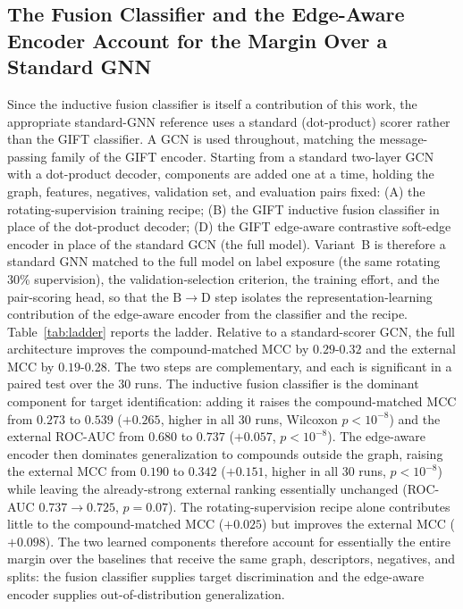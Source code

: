 \documentclass[11pt,letterpaper]{article}
\begin{document}
\subsection{The Fusion Classifier and the Edge-Aware Encoder Account for the Margin Over a Standard GNN}
\label{sec:ladder}
Since the inductive fusion classifier is itself a contribution of this work, the appropriate standard-GNN reference uses a standard (dot-product) scorer rather than the GIFT classifier. A GCN is used throughout, matching the message-passing family of the GIFT encoder. Starting from a standard two-layer GCN with a dot-product decoder, components are added one at a time, holding the graph, features, negatives, validation set, and evaluation pairs fixed: (A) the rotating-supervision training recipe; (B) the GIFT inductive fusion classifier in place of the dot-product decoder; (D) the GIFT edge-aware contrastive soft-edge encoder in place of the standard GCN (the full model). Variant~B is therefore a standard GNN matched to the full model on label exposure (the same rotating 30\% supervision), the validation-selection criterion, the training effort, and the pair-scoring head, so that the $\mathrm{B}\!\to\!\mathrm{D}$ step isolates the representation-learning contribution of the edge-aware encoder from the classifier and the recipe. Table~\ref{tab:ladder} reports the ladder. Relative to a standard-scorer GCN, the full architecture improves the compound-matched MCC by $0.29$-$0.32$ and the external MCC by $0.19$-$0.28$. The two steps are complementary, and each is significant in a paired test over the 30 runs. The inductive fusion classifier is the dominant component for target identification: adding it raises the compound-matched MCC from $0.273$ to $0.539$ ($+0.265$, higher in all 30 runs, Wilcoxon $p<10^{-8}$) and the external ROC-AUC from $0.680$ to $0.737$ ($+0.057$, $p<10^{-8}$). The edge-aware encoder then dominates generalization to compounds outside the graph, raising the external MCC from $0.190$ to $0.342$ ($+0.151$, higher in all 30 runs, $p<10^{-8}$) while leaving the already-strong external ranking essentially unchanged (ROC-AUC $0.737\to0.725$, $p=0.07$). The rotating-supervision recipe alone contributes little to the compound-matched MCC ($+0.025$) but improves the external MCC ($+0.098$). The two learned components therefore account for essentially the entire margin over the baselines that receive the same graph, descriptors, negatives, and splits: the fusion classifier supplies target discrimination and the edge-aware encoder supplies out-of-distribution generalization.
\end{document}
